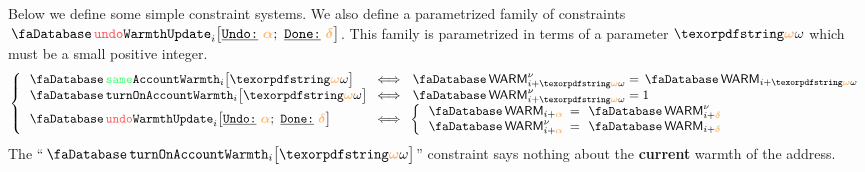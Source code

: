 Below we define some simple constraint systems.
We also define a parametrized family of constraints $\accUndoWarmthUpdate {i}{\reluo}{\reldo}$.
This family is parametrized in terms of a parameter $\relof$ which must be a small positive integer.
\[
	\left\{ \begin{array}{lcl}
		\accSameWarmth           {i}{\relof}         & \!\!\! \iff \!\!\! & \accWarmth\new_{i + \relof} = \accWarmth_{i + \relof} \\
		\accTurnOnWarmth         {i}{\relof}         & \!\!\! \iff \!\!\! & \accWarmth\new_{i + \relof} = 1                       \\
		\accUndoWarmthUpdate     {i}{\reluo}{\reldo} & \!\!\! \iff \!\!\! &
		\left\{ \begin{array}{lcl}
			\accWarmth      _{i + \reluo} & \!\!\! = \!\!\! & \accWarmth\new    _{i + \reldo} \\
			\accWarmth\new  _{i + \reluo} & \!\!\! = \!\!\! & \accWarmth        _{i + \reldo} \\
		\end{array} \right. \\
	\end{array} \right.
\]
\saNote{} The ``$\accTurnOnWarmth {i}{\relof}$'' constraint says nothing about the \textbf{current} warmth of the address. 
